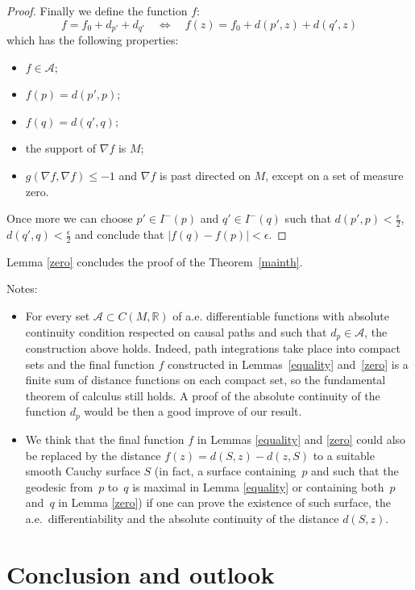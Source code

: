 \documentclass[pdftex]{sigma}
\newcommand{\abs}[1]{\left\vert {#1} \right\vert}
\newcommand{\setR}{{\mathbb R}}
\newcommand{\Lequi}{\Longleftrightarrow}
\begin{document}
\begin{proof}
Finally we def\/ine the function $f$:
\[
f = f_0 + d_{p'} + d_{q'}  \quad \Lequi \quad   f(z) = f_0 + d(p',z) + d(q',z)
\]
which has the following properties:
\begin{itemize}\itemsep=0pt
\item $f\in\mathcal A$;
\item $f(p)= d(p',p)$;
\item $f(q)= d(q',q)$;
\item the support of $\nabla f$ is $M$;
\item $g( \nabla f, \nabla f) \leq -1$ and $\nabla f$ is past directed on $M$, except on a set of measure zero.
\end{itemize}

Once more we can choose $p' \in I^-(p)$ and $q' \in I^-(q)$ such that $d(p',p) < \frac\epsilon2$, $d(q',q) < \frac\epsilon2$ and conclude that $\abs{f(q)-f(p)} < \epsilon$.
\end{proof}

Lemma \ref{zero} concludes the proof of the Theorem~\ref{mainth}.

Notes:
\begin{itemize}\itemsep=0pt
\item For every set $\mathcal A \subset C(M,\setR)$ of a.e. dif\/ferentiable functions with absolute continuity condition respected on causal paths and such that $d_p \in \mathcal A$, the construction above holds. Indeed, path integrations take place into compact sets and the f\/inal function $f$ constructed in Lemmas~\ref{equality} and~\ref{zero} is a f\/inite sum of distance functions on each compact set, so the fundamental theorem of calculus still holds. A proof of the absolute continuity of the function $d_p$ would be then a good improve of our result.
\item We think that the f\/inal function $f$ in Lemmas \ref{equality} and \ref{zero} could also be replaced by the distance $f(z) = d(S,z) - d(z,S)$ to a suitable smooth Cauchy surface $S$ (in fact, a surface containing~$p$ and such that the geodesic from~$p$ to~$q$ is maximal in Lemma \ref{equality} or con\-taining both~$p$ and~$q$ in Lemma \ref{zero}) if one can prove the existence of such surface, the a.e.\ dif\/ferentiability and the absolute continuity of the distance $d(S,z)$.
\end{itemize}



\section{Conclusion and outlook}
\end{document}
